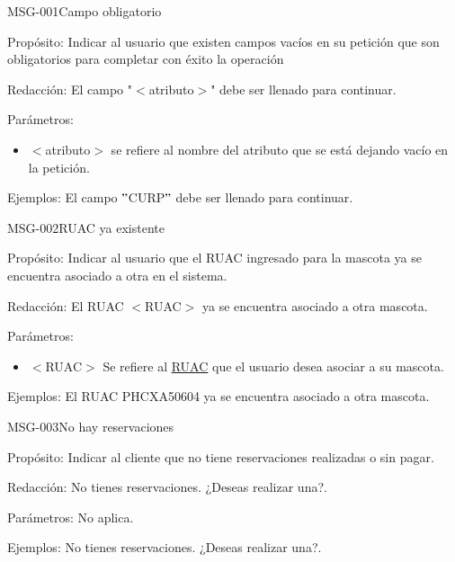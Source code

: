 \begin{cdtMessage}[msgErrorColor]{MSG-001}{Campo obligatorio}
	\item[Propósito:] Indicar al usuario que existen campos vacíos en su petición que son obligatorios para completar con éxito la operación
	\item[Redacción:] El campo "$<$atributo$>$" debe ser llenado para continuar.
	\item[Parámetros:] \hspace{1cm}
	\begin{itemize}
		\item $<$atributo$>$ se refiere al nombre del atributo que se está dejando vacío en la petición.
	\end{itemize}
	\item[Ejemplos:] El campo $"$CURP$"$ debe ser llenado para continuar.
\end{cdtMessage}

\begin{cdtMessage}[msgErrorColor]{MSG-002}{RUAC ya existente} 
	\item[Propósito:] Indicar al usuario que el RUAC ingresado para la mascota ya se encuentra asociado a otra en el sistema.
	\item[Redacción:] El RUAC $<$RUAC$>$ ya se encuentra asociado a otra mascota.
	\item[Parámetros:] \hspace{1cm}
	\begin{itemize}
		\item $<$RUAC$>$ Se refiere al \hyperlink{mascota.RUAC}{RUAC} que el usuario desea asociar a su mascota.
	\end{itemize}
	\item[Ejemplos:] El RUAC PHCXA50604 ya se encuentra asociado a otra mascota.
\end{cdtMessage}

\begin{cdtMessage}[msgErrorColor]{MSG-003}{No hay reservaciones} 
	\item[Propósito:] Indicar al cliente que no tiene reservaciones realizadas o sin pagar.
	\item[Redacción:] No tienes reservaciones. ¿Deseas realizar una?.
	\item[Parámetros:] No aplica.
	\item[Ejemplos:] No tienes reservaciones. ¿Deseas realizar una?.
\end{cdtMessage}

